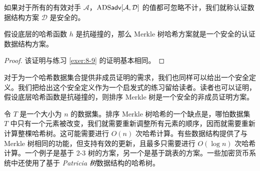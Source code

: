 \begin{definition}\label{def:8-4}
如果对于所有的有效对手 $\mathcal{A}$，${\rm ADS}\mathsf{adv}[\mathcal{A},\mathcal{D}]$ 的值都可忽略不计，我们就称认证数据结构方案 $\mathcal{D}$ 是安全的。
\end{definition}

\begin{theorem}\label{theo:8-8}
假设底层的哈希函数 $h$ 是抗碰撞的，那么 Merkle 树哈希方案就是一个安全的认证数据结构方案。
\end{theorem}

\begin{proof}
该证明与练习 \ref{exer:8-9} 的证明基本相同。
\end{proof}

对于为一个哈希数据集合提供非成员证明的需求，我们也同样可以给出一个安全定义。我们把给出这个安全定义作为一个启发式的练习留给读者。读者也可以证明，假设底层哈希函数是抗碰撞的，则排序 Merkle 树是一个安全的非成员证明方案。

\begin{snote}
令 $T$ 是一个大小为 $n$ 的数据集。排序 Merkle 树哈希的一个缺点是，哪怕数据集 $T$ 中只有一个元素被改变，我们就需要重新调整所有元素的顺序，因而就需要重新计算整棵哈希树。这可能需要进行 $O(n)$ 次哈希计算。有些数据结构提供了与 Merkle 树相同的功能，但支持有效的更新，且最多只需要进行 $O(\log n)$ 次哈希计算。一个例子是基于 2-3 树的方案，另一个是基于跳表的方案。一些加密货币系统中还使用了基于 \emph{Patricia 树}数据结构的哈希树。
\end{snote}